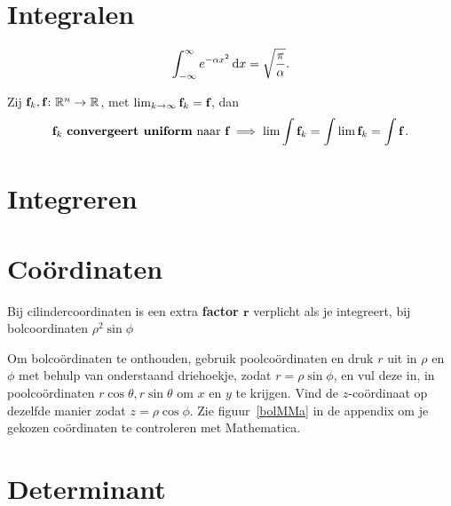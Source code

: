 \documentclass{article}
\begin{document}
    \section{Integralen}\label{sec:integralen}

    \begin{stelling}
        \[ \int_{-\infty}^\infty e^{-\alpha x^2} \mathop{}\!\mathrm{d} x = \sqrt {\frac \pi \alpha}.\]
    \end{stelling}

    \begin{stelling}
        Zij ${\textbf{f}}_k,{\textbf{f}} \colon \mathbb{R}^n \to \mathbb{R}$, met $\lim_{k \to \infty} {\textbf{f}}_k = {\textbf{f}}$, dan
        \[ {\textbf{f}}_k \text { \textbf{convergeert uniform} naar } {\textbf{f}} \implies \lim \int {\textbf{f}}_k = \int \lim {\textbf{f}}_k = \int {\textbf{f}} \,. \]
    \end{stelling}

    \section{Integreren}\label{sec:integreren}
    

    \section{Co\"ordinaten}\label{sec:coordinaten}
    Bij cilindercoordinaten is een extra \textbf{factor $\bm r$} verplicht als je integreert, bij bolcoordinaten $\rho^2 \sin \phi$

    Om bolco\"ordinaten te onthouden, gebruik poolco\"ordinaten en druk $r$ uit in $\rho$ en $\phi$ met behulp van onderstaand driehoekje, zodat $r=\rho \sin \phi$, en vul deze in, in poolco\"ordinaten $r \cos \theta,r \sin \theta$ om $x$ en $y$ te krijgen.
    Vind de $z$-co\"ordinaat op dezelfde manier zodat $z=\rho \cos \phi$.
    Zie figuur~\ref{bolMMa} in de appendix om je gekozen co\"ordinaten te controleren met Mathematica.


    \section{Determinant}\label{sec:determinant}
\end{document}
